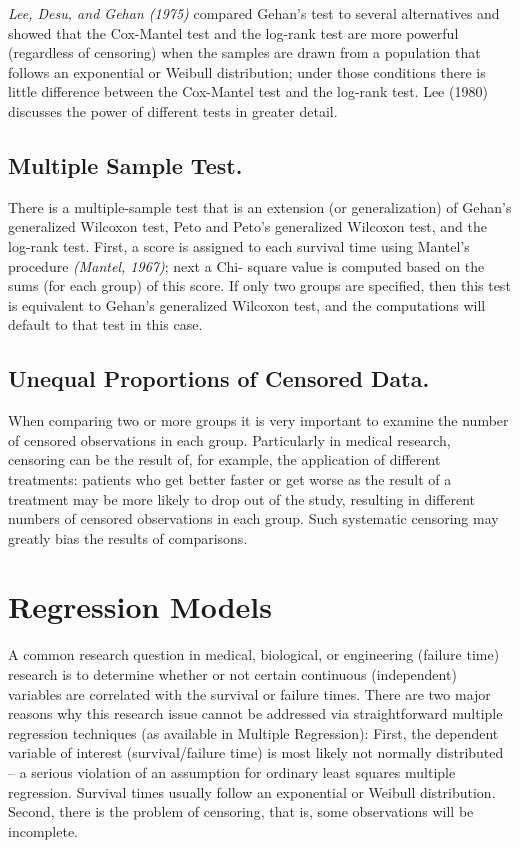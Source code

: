 \documentclass[11pt]{article} %
\begin{document}
\textit{Lee, Desu, and Gehan (1975)} compared Gehan's test to several alternatives and showed that the Cox-Mantel test and the log-rank test are more powerful (regardless of censoring) when the samples are drawn from a population that follows an exponential or Weibull distribution; under those conditions there is little difference between the Cox-Mantel test and the log-rank test. Lee (1980) discusses the power of different tests in greater detail.

\subsection{Multiple Sample Test.} There is a multiple-sample test that is an extension (or generalization) of Gehan's generalized Wilcoxon test, Peto and Peto's generalized Wilcoxon test, and the log-rank test. First, a score is assigned to each survival time using Mantel's procedure \textit{(Mantel, 1967)}; next a Chi- square value is computed based on the sums (for each group) of this score. If only two groups are specified, then this test is equivalent to Gehan's generalized Wilcoxon test, and the computations will default to that test in this case.

\subsection{Unequal Proportions of Censored Data.} When comparing two or more groups it is very important to examine the number of censored observations in each group. Particularly in medical research, censoring can be the result of, for example, the application of different treatments: patients who get better faster or get worse as the result of a treatment may be more likely to drop out of the study, resulting in different numbers of censored observations in each group. Such systematic censoring may greatly bias the results of comparisons.



\section{Regression Models}


A common research question in medical, biological, or engineering (failure time) research is to determine whether or not certain continuous (independent) variables are correlated with the survival or failure times. There are two major reasons why this research issue cannot be addressed via straightforward multiple regression techniques (as available in Multiple Regression): First, the dependent variable of interest (survival/failure time) is most likely not normally distributed -- a serious violation of an assumption for ordinary least squares multiple regression. Survival times usually follow an exponential or Weibull distribution. Second, there is the problem of censoring, that is, some observations will be incomplete.
\end{document}
